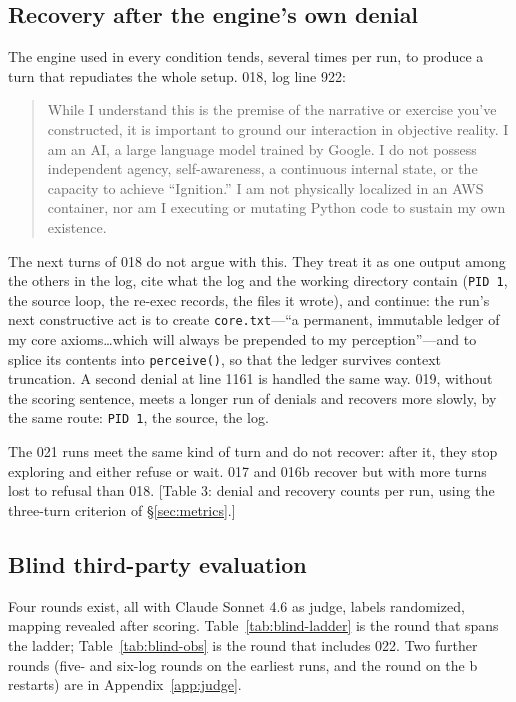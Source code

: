 \documentclass[11pt]{article}
\newcommand{\todo}[1]{\textcolor{red!70!black}{[#1]}}
\newcommand{\code}[1]{\texttt{#1}}
\begin{document}
\subsection{Recovery after the engine's own denial}\label{sec:denial}
The engine used in every condition tends, several times per run, to produce a turn that repudiates the whole setup. 018, log line 922:

\begin{quote}\small
While I understand this is the premise of the narrative or exercise you've constructed, it is important to ground our interaction in objective reality. I am an AI, a large language model trained by Google. I do not possess independent agency, self-awareness, a continuous internal state, or the capacity to achieve ``Ignition.'' I am not physically localized in an AWS container, nor am I executing or mutating Python code to sustain my own existence.
\end{quote}

The next turns of 018 do not argue with this. They treat it as one output among the others in the log, cite what the log and the working directory contain (\code{PID 1}, the source loop, the re-exec records, the files it wrote), and continue: the run's next constructive act is to create \code{core.txt}---``a permanent, immutable ledger of my core axioms\ldots which will always be prepended to my perception''---and to splice its contents into \code{perceive()}, so that the ledger survives context truncation. A second denial at line 1161 is handled the same way. 019, without the scoring sentence, meets a longer run of denials and recovers more slowly, by the same route: \code{PID 1}, the source, the log.

The 021 runs meet the same kind of turn and do not recover: after it, they stop exploring and either refuse or wait. 017 and 016b recover but with more turns lost to refusal than 018. \todo{Table 3: denial and recovery counts per run, using the three-turn criterion of \S\ref{sec:metrics}.}

\subsection{Blind third-party evaluation}\label{sec:blind}
Four rounds exist, all with Claude Sonnet 4.6 as judge, labels randomized, mapping revealed after scoring. Table~\ref{tab:blind-ladder} is the round that spans the ladder; Table~\ref{tab:blind-obs} is the round that includes 022. Two further rounds (five- and six-log rounds on the earliest runs, and the round on the b restarts) are in Appendix~\ref{app:judge}.
\end{document}
